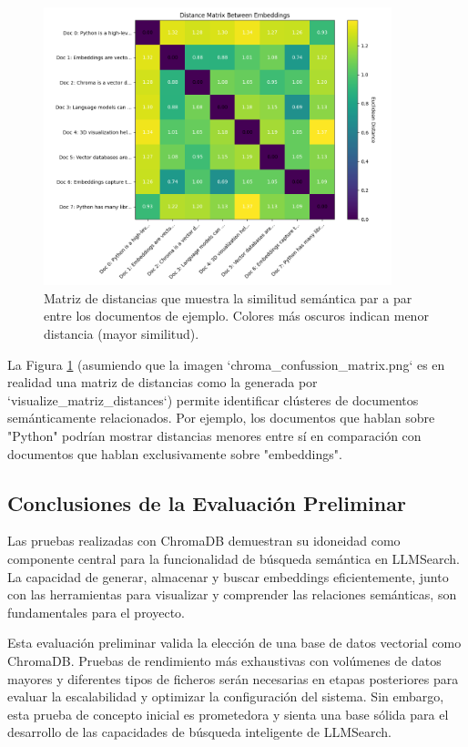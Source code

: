 \begin{figure}[H]
\centering
\includegraphics[width=0.9\textwidth]{archivos/chroma_confussion_matrix.png} %
\caption[Matriz de Distancias Semánticas entre Documentos con ChromaDB]{Matriz de distancias que muestra la similitud semántica par a par entre los documentos de ejemplo. Colores más oscuros indican menor distancia (mayor similitud).}
\label{fig:chroma_dist_matrix_eval}
\end{figure}

La Figura \ref{fig:chroma_dist_matrix_eval} (asumiendo que la imagen `chroma\_confussion\_matrix.png` es en realidad una matriz de distancias como la generada por `visualize\_matriz\_distances`) permite identificar clústeres de documentos semánticamente relacionados. Por ejemplo, los documentos que hablan sobre "Python" podrían mostrar distancias menores entre sí en comparación con documentos que hablan exclusivamente sobre "embeddings".

\subsection{Conclusiones de la Evaluación Preliminar}
Las pruebas realizadas con ChromaDB demuestran su idoneidad como componente central para la funcionalidad de búsqueda semántica en LLMSearch. La capacidad de generar, almacenar y buscar embeddings eficientemente, junto con las herramientas para visualizar y comprender las relaciones semánticas, son fundamentales para el proyecto.

Esta evaluación preliminar valida la elección de una base de datos vectorial como ChromaDB. Pruebas de rendimiento más exhaustivas con volúmenes de datos mayores y diferentes tipos de ficheros serán necesarias en etapas posteriores para evaluar la escalabilidad y optimizar la configuración del sistema. Sin embargo, esta prueba de concepto inicial es prometedora y sienta una base sólida para el desarrollo de las capacidades de búsqueda inteligente de LLMSearch.